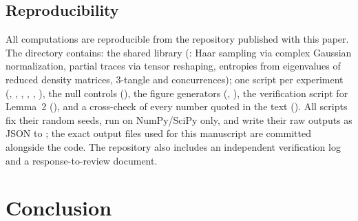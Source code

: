 \documentclass[11pt]{article}
\begin{document}
\subsection{Reproducibility}
\label{sec:repro}

\begin{sloppypar}
All computations are reproducible from the repository published with this paper. The  directory contains: the shared library (: Haar sampling via complex Gaussian normalization, partial traces via tensor reshaping, entropies from eigenvalues of reduced density matrices, 3-tangle and concurrences); one script per experiment (, , , , , ), the null controls (), the figure generators (, ), the verification script for Lemma~2 (), and a cross-check of every number quoted in the text (). All scripts fix their random seeds, run on NumPy/SciPy only, and write their raw outputs as JSON to ; the exact output files used for this manuscript are committed alongside the code. The repository also includes an independent verification log and a response-to-review document.
\end{sloppypar}

\section{Conclusion}
\label{sec:conclusion}
\end{document}
